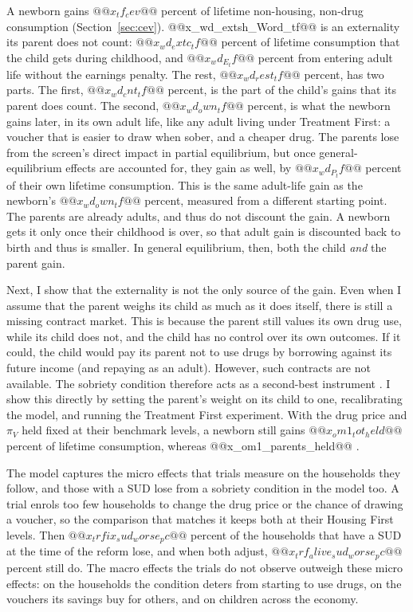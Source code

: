\documentclass[10pt]{article}
\begin{document}
A newborn gains $@@x_tf_cev@@$ percent of lifetime non-housing, non-drug consumption (Section~\ref{sec:cev}). @@x_wd_extsh_Word_tf@@ is an externality its parent does not count: $@@x_wd_extc_tf@@$ percent of lifetime consumption that the child gets during childhood, and $@@x_wd_E_tf@@$ percent from entering adult life without the earnings penalty. The rest, $@@x_wd_rest_tf@@$ percent, has two parts. The first, $@@x_wd_cnt_tf@@$ percent, is the part of the child's gains that its parent does count. The second, $@@x_wd_own_tf@@$ percent, is what the newborn gains later, in its own adult life, like any adult living under Treatment First: a voucher that is easier to draw when sober, and a cheaper drug. The parents lose from the screen's direct impact in partial equilibrium, but once general-equilibrium effects are accounted for, they gain as well, by $@@x_wd_P_tf@@$ percent of their own lifetime consumption. This is the same adult-life gain as the newborn's $@@x_wd_own_tf@@$ percent, measured from a different starting point.   The parents are already adults, and thus do not discount the gain. A newborn gets it only once their childhood is over, so that adult gain is discounted back to birth and thus is smaller. In general equilibrium, then, both the child \emph{and} the parent gain.

 Next, I show that the externality  is not the only source of the gain. Even  when I assume that the parent  weighs its child as much as it does itself, there is still a missing contract market. This is because the parent still values its own drug use,  while its child does not, and the child has no control over its own outcomes.  If it could, the child would pay its parent not to  use drugs by borrowing against its future income  (and repaying as an  adult). However,  such contracts are not available. The sobriety condition therefore acts as a  second-best instrument .  I show this  directly by setting the parent's weight on its child to one,  recalibrating the model, and running the Treatment First experiment. With the drug price and $\pi_V$ held fixed at their benchmark levels, a newborn still gains $@@x_om1_tot_held@@$ percent of lifetime consumption,  whereas @@x_om1_parents_held@@ .

The model captures the micro effects that trials measure on the households they follow, and those with a SUD lose from a sobriety condition in the model too. A trial enrols too few households to change the drug price or the chance of drawing a voucher, so the comparison that matches it keeps both at their Housing First levels. Then $@@x_trfix_sud_worse_pc@@$ percent of the households that have a SUD at the time of the reform lose, and when both adjust, $@@x_trf_alive_sud_worse_pc@@$ percent still do. The macro effects the trials do not observe outweigh these micro effects: on the households the condition deters from starting to use drugs, on the vouchers its savings buy for others, and on children across the economy.
\end{document}
